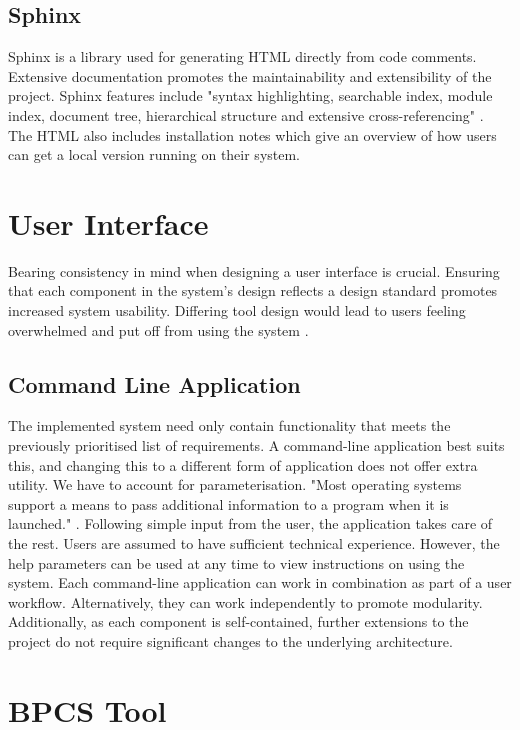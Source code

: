 \documentclass{l4proj}
\begin{document}
\subsection{Sphinx}\label{sphinx}

Sphinx is a library used for generating HTML directly from code comments. Extensive documentation promotes the maintainability and extensibility of the project. Sphinx features include "syntax highlighting, searchable index, module index, document tree, hierarchical structure and extensive cross-referencing" \citep{sphinx}. The HTML also includes installation notes which give an overview of how users can get a local version running on their system.

\section{User Interface}

Bearing consistency in mind when designing a user interface is crucial.  Ensuring that each component in the system's design reflects a design standard promotes increased system usability. Differing tool design would lead to users feeling overwhelmed and put off from using the system \citep{consistency}. 

\subsection{Command Line Application} \label{command_line}

The implemented system need only contain functionality that meets the previously prioritised list of requirements. A command-line application best suits this, and changing this to a different form of application does not offer extra utility. We have to account for parameterisation. "Most operating systems support a means to pass additional information to a program when it is launched." \citep{commandline}.  Following simple input from the user, the application takes care of the rest. Users are assumed to have sufficient technical experience. However, the help parameters can be used at any time to view instructions on using the system. Each command-line application can work in combination as part of a user workflow. Alternatively, they can work independently to promote modularity. Additionally, as each component is self-contained, further extensions to the project do not require significant changes to the underlying architecture.

\section{BPCS Tool}\label{implementation_bpcs_tool}
\end{document}
